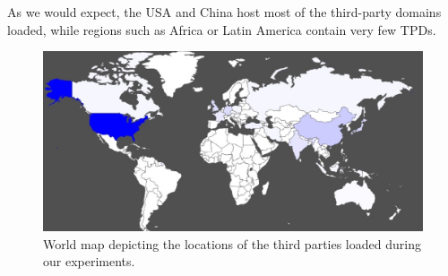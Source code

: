\documentclass{sig-alternate}
\begin{document}
As we would expect, the USA and China host most of the third-party domains loaded, while regions such as Africa or Latin America contain very few TPDs.

\begin{figure}
 \centering
 \includegraphics[width=\textwidth]{figures/third_party_map.eps}
 \caption{World map depicting the locations of the third parties loaded during our experiments.}
 \label{fig:third_party_map}
\end{figure}
\end{document}

